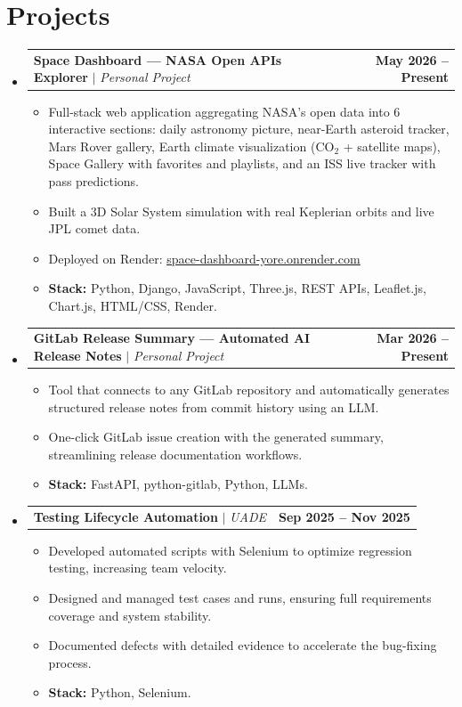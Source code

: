 \documentclass[letterpaper,10pt]{article}
\makeatletter
\newcommand{\resumeItem}[1]{
  \item\small{
    {#1 \vspace{-2pt}}
  }
}
\newcommand{\resumeProjectHeading}[2]{
    \vspace{-2pt}\item
    \begin{tabular*}{1.0\textwidth}{l@{\extracolsep{\fill}}r}
      \small#1 & \textbf{\small #2}\\
    \end{tabular*}\vspace{-6pt}
}
\newcommand{\resumeSubHeadingListStart}{\begin{itemize}[leftmargin=0.0in, label={}]}
\newcommand{\resumeSubHeadingListEnd}{\end{itemize}}
\newcommand{\resumeItemListStart}{\begin{itemize}[leftmargin=0.15in, labelsep=5pt, itemsep=2pt]}
\newcommand{\resumeItemListEnd}{\end{itemize}\vspace{-4pt}}
\makeatother
\begin{document}
\section{Projects}
    \resumeSubHeadingListStart
      \resumeProjectHeading
          {\textbf{Space Dashboard --- NASA Open APIs Explorer} $|$ \emph{Personal Project}}{May 2026 -- Present}
          \resumeItemListStart
            \resumeItem{Full-stack web application aggregating NASA's open data into 6 interactive sections: daily astronomy picture, near-Earth asteroid tracker, Mars Rover gallery, Earth climate visualization ($\text{CO}_2$ + satellite maps), Space Gallery with favorites and playlists, and an ISS live tracker with pass predictions.}
            \resumeItem{Built a 3D Solar System simulation with real Keplerian orbits and live JPL comet data.}
            \resumeItem{Deployed on Render: \href{https://space-dashboard-yore.onrender.com}{\underline{space-dashboard-yore.onrender.com}}}
            \resumeItem{\textbf{Stack:} Python, Django, JavaScript, Three.js, REST APIs, Leaflet.js, Chart.js, HTML/CSS, Render.}
          \resumeItemListEnd

      \resumeProjectHeading
          {\textbf{GitLab Release Summary --- Automated AI Release Notes} $|$ \emph{Personal Project}}{Mar 2026 -- Present}
          \resumeItemListStart
            \resumeItem{Tool that connects to any GitLab repository and automatically generates structured release notes from commit history using an LLM.}
            \resumeItem{One-click GitLab issue creation with the generated summary, streamlining release documentation workflows.}
            \resumeItem{\textbf{Stack:} FastAPI, python-gitlab, Python, LLMs.}
          \resumeItemListEnd

      \resumeProjectHeading
          {\textbf{Testing Lifecycle Automation} $|$ \emph{UADE}}{Sep 2025 -- Nov 2025}
          \resumeItemListStart
            \resumeItem{Developed automated scripts with Selenium to optimize regression testing, increasing team velocity.}
            \resumeItem{Designed and managed test cases and runs, ensuring full requirements coverage and system stability.}
            \resumeItem{Documented defects with detailed evidence to accelerate the bug-fixing process.}
            \resumeItem{\textbf{Stack:} Python, Selenium.}
          \resumeItemListEnd
    \resumeSubHeadingListEnd

\end{document}
